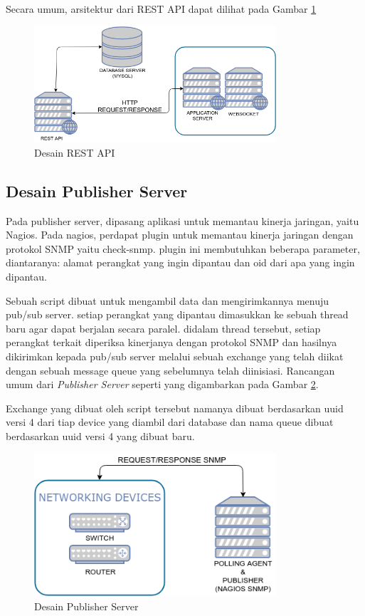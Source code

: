             	Secara umum, arsitektur dari REST API dapat dilihat pada Gambar \ref{desain:desainrestapi}\\
                \begin{figure}[H]
                    \centering
                    \includegraphics[width=9cm]{Images/C-3/desainrestapi.png}
                    \caption{Desain REST API}
                    \label{desain:desainrestapi}
				\end{figure}
            
		\subsection{Desain Publisher Server}
			Pada publisher server, dipasang aplikasi untuk memantau kinerja jaringan, yaitu Nagios. Pada nagios, perdapat plugin untuk memantau kinerja jaringan dengan protokol SNMP yaitu check-snmp. plugin ini membutuhkan beberapa parameter, diantaranya: alamat perangkat yang ingin dipantau dan oid dari apa yang ingin dipantau.
			
			Sebuah script dibuat untuk mengambil data dan mengirimkannya menuju pub/sub server. setiap perangkat yang dipantau dimasukkan ke sebuah thread baru agar dapat berjalan secara paralel. didalam thread tersebut, setiap perangkat terkait diperiksa kinerjanya dengan protokol SNMP dan hasilnya dikirimkan kepada pub/sub server melalui sebuah exchange yang telah diikat dengan sebuah message queue yang sebelumnya telah diinisiasi. Rancangan umum dari \textit{Publisher Server} seperti yang digambarkan pada Gambar \ref{desain:desainpublisher}.
			
			Exchange yang dibuat oleh script tersebut namanya dibuat berdasarkan uuid versi 4 dari tiap device yang diambil dari database dan nama queue dibuat berdasarkan uuid versi 4 yang dibuat baru.
			
			\begin{figure}[H]
				\centering
				\includegraphics[width=9cm]{Images/C-3/desainpublisher.png}
				\caption{Desain Publisher Server}
				\label{desain:desainpublisher}
			\end{figure}
                

